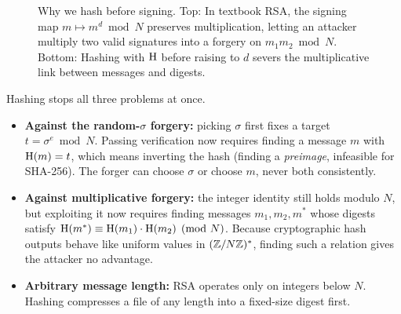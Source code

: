 \begin{figure}[htbp]
\caption{Why we hash before signing. Top: In textbook RSA, the signing map $m \mapsto m^d \bmod N$ preserves multiplication, letting an attacker multiply two valid signatures into a forgery on $m_1 m_2 \bmod N$. Bottom: Hashing with $\operatorname{H}$ before raising to $d$ severs the multiplicative link between messages and digests.}
\label{ch22:fig-rsa-hash-vs-textbook}
\end{figure}

\begin{whybox}
Hashing stops all three problems at once.
\begin{itemize}
  \item \textbf{Against the random-$\sigma$ forgery:} picking $\sigma$ first fixes a target $t = \sigma^e \bmod N$. Passing verification now requires finding a message $m$ with $\operatorname{H}(m) = t$, which means inverting the hash (finding a \emph{preimage}, infeasible for SHA-256). The forger can choose $\sigma$ or choose $m$, never both consistently.
  \item \textbf{Against multiplicative forgery:} the integer identity still holds modulo $N$, but exploiting it now requires finding messages $m_1, m_2, m^*$ whose digests satisfy $\operatorname{H}(m^*) \equiv \operatorname{H}(m_1)\cdot\operatorname{H}(m_2) \pmod N$. Because cryptographic hash outputs behave like uniform values in $(\mathbb{Z}/N\mathbb{Z})^{*}$, finding such a relation gives the attacker no advantage.
  \item \textbf{Arbitrary message length:} RSA operates only on integers below $N$. Hashing compresses a file of any length into a fixed-size digest first.
\end{itemize}
\end{whybox}


